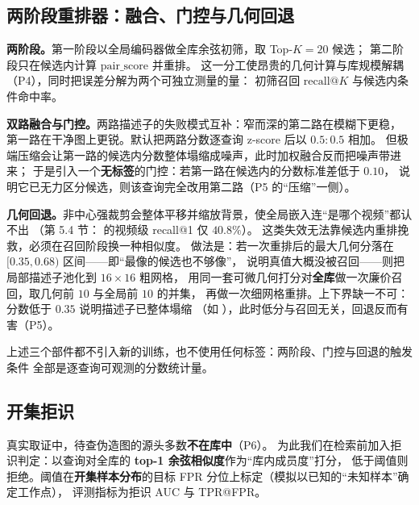\subsection{两阶段重排器：融合、门控与几何回退}
\label{sec:two-stage}

\textbf{两阶段。}第一阶段以全局编码器做全库余弦初筛，取 Top-$K=20$ 候选；
第二阶段只在候选内计算 $\mathrm{pair\_score}$ 并重排。
这一分工使昂贵的几何计算与库规模解耦（P4），同时把误差分解为两个可独立测量的量：
初筛召回 $\mathrm{recall@}K$ 与候选内条件命中率。

\textbf{双路融合与门控。}两路描述子的失败模式互补：窄而深的第二路在模糊下更稳，
第一路在干净图上更锐。默认把两路分数逐查询 z-score 后以 $0.5:0.5$ 相加。
但极端压缩会让第一路的候选内分数整体塌缩成噪声，此时加权融合反而把噪声带进来；
于是引入一个\textbf{无标签}的门控：若第一路在候选内的分数标准差低于 $0.10$，
说明它已无力区分候选，则该查询完全改用第二路（P5 的“压缩”一侧）。

\textbf{几何回退。}非中心强裁剪会整体平移并缩放背景，使全局嵌入连“是哪个视频”都认不出
（第 5.4 节： 的视频级 recall@1 仅 $40.8\%$）。
这类失效无法靠候选内重排挽救，必须在召回阶段换一种相似度。
做法是：若一次重排后的最大几何分落在 $[0.35,0.68)$ 区间——即“最像的候选也不够像”，
说明真值大概没被召回——则把局部描述子池化到 $16\times16$ 粗网格，
用同一套可微几何打分对\textbf{全库}做一次廉价召回，取几何前 $10$ 与全局前 $10$ 的并集，
再做一次细网格重排。上下界缺一不可：分数低于 $0.35$ 说明描述子已整体塌缩
（如 ），此时低分与召回无关，回退反而有害（P5）。

上述三个部件都不引入新的训练，也不使用任何标签：两阶段、门控与回退的触发条件
全部是逐查询可观测的分数统计量。

\subsection{开集拒识}

真实取证中，待查伪造图的源头多数\textbf{不在库中}（P6）。
为此我们在检索前加入拒识判定：以查询对全库的 \textbf{top-1 余弦相似度}作为“库内成员度”打分，
低于阈值则拒绝。阈值在\textbf{开集样本分布}的目标 FPR 分位上标定（模拟以已知的“未知样本”确定工作点），
评测指标为拒识 AUC 与 TPR@FPR。

